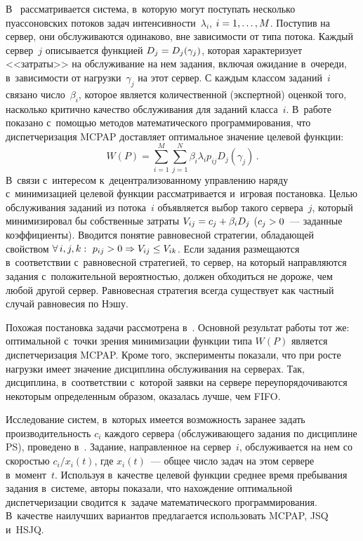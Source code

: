 \begin{multicols}{2}
    В~\cite{32-kon} рассматривается система, в~которую могут поступать несколько 
пуассоновских потоков задач интенсивности~$\lambda_i$, $i\hm= 1,\ldots, M$. Поступив 
на сервер, они обслуживаются одинаково, вне за\-ви\-си\-мости от типа потока. Каждый 
сервер~$j$ описывается функцией $D_j\hm= D_j(\gamma_j)$, которая характеризует 
<<затраты>> на обслуживание на нем задания, включая ожидание в~очереди, 
в~зависимости от нагрузки~$\gamma_j$ на этот сервер. С каждым классом заданий~$i$ 
связано число~$\beta_i$, которое является количественной (экспертной) оценкой того, 
насколько критично качество обслуживания для заданий класса~$i$. В~работе показано 
с~помощью методов математического программирования, что диспетчеризация MCPAP 
доставляет оптимальное значение целевой функции: 
$$
W(P)  = \sum\limits_{i=1}^M 
\sum\limits_{j=1}^N \beta_i \lambda_i p_{ij} D_j(\gamma_j)\,.
$$
 В~связи с~интересом 
к~децентрализованному управ\-ле\-нию наряду с~минимизацией целевой функции 
рас\-смат\-ри\-ва\-ет\-ся и~игровая постановка. Целью обслуживания заданий из потока~$i$ 
объявляется выбор такого сервера~$j$, который минимизировал бы собственные затраты 
$V_{ij} \hm= c_j\hm+ \beta_i D_j$ ($c_j\hm>0$~--- заданные коэффициенты). Вводится 
понятие равновесной стратегии, обладающей свойством $\forall\,i,j,k:\ p_{ij}\hm> 
0\hm\Rightarrow V_{ij}\hm\leq V_{ik}$. Если задания размещаются в~соответствии 
с~равновесной стратегией, то сервер, на который направляются задания с~положительной 
вероятностью, должен обходиться не дороже, чем любой другой сервер. Равновесная 
стратегия всегда существует как частный случай равновесия по Нэшу.
    
    Похожая постановка задачи рассмотрена в~\cite{33-kon}. Основной результат работы 
тот же: оптимальной с~точки зрения минимизации функции типа $W(P)$ является 
диспетчеризация MCPAP. Кроме того, эксперименты показали, что при росте нагрузки 
имеет значение дисциплина обслуживания на серверах. Так, дисциплина, в~соответствии 
с~которой заявки на сервере переупорядочиваются некоторым определенным образом, 
оказалась лучше, чем FIFO.
    
    Исследование систем, в~которых имеется возможность заранее задать 
производительность $c_i$ каж\-до\-го сервера (обслуживающего задания по дисциплине PS), 
проведено в~\cite{1-kon}. Задание, направленное на сервер~$i$, обслуживается на нем со 
скоростью $c_i/x_i(t)$, где $x_i(t)$~--- общее число задач на этом сервере в~момент~$t$. 
Используя в~качестве целевой функции среднее время пребывания задания в~сис\-те\-ме, 
авторы показали, что нахождение оптимальной диспетчеризации сводится к~задаче 
математического программирования. В~качестве наилучших вариантов предлагается 
использовать MCPAP, JSQ и~HSJQ.
    

\end{multicols}
